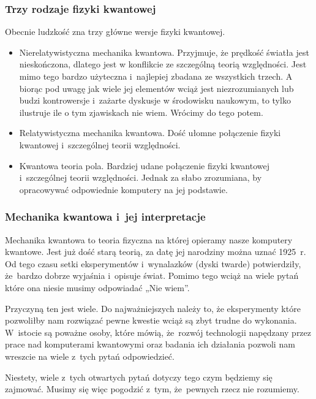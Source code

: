 \documentclass[10pt,t]{beamer}
\begin{document}
\begin{frame}
  \frametitle{Trzy rodzaje fizyki kwantowej}


  Obecnie ludzkość zna trzy główne wersje fizyki kwantowej.

  \begin{itemize}
    \RaggedRight

  \item \alert{Nierelatywistyczna mechanika kwantowa.} Przyjmuje, że
    prędkość światła jest nieskończona, dlatego jest w konflikcie ze
    szczególną teorią względności. Jest mimo tego bardzo użyteczna
    i~najlepiej zbadana ze wszystkich trzech. A biorąc pod uwagę jak
    wiele jej elementów wciąż jest niezrozumianych lub budzi
    kontrowersje i~zażarte dyskusje w środowisku naukowym, to tylko
    ilustruje ile o tym zjawiskach nie wiem. Wrócimy do tego potem.

  \item Relatywistyczna mechanika kwantowa. Dość ułomne połączenie fizyki
    kwantowej i~szczególnej teorii względności.

  \item Kwantowa teoria pola. Bardziej udane połączenie fizyki kwantowej
    i~szczególnej teorii względności. Jednak za słabo zrozumiana, by
    opracowywać odpowiednie komputery na jej podstawie.

  \end{itemize}

\end{frame}





\begin{frame}
  \frametitle{Mechanika kwantowa i~jej interpretacje}


  Mechanika kwantowa to teoria fizyczna na której opieramy nasze komputery
  kwantowe. Jest już dość starą teorią, za datę jej narodziny można uznać
  1925~r. Od tego czasu setki eksperymentów i~wynalazków (dyski
  twarde) potwierdziły, że~bardzo dobrze wyjaśnia i~opisuje świat.
  Pomimo tego wciąż na wiele pytań które ona niesie musimy
  odpowiadać „Nie wiem”.

  Przyczyną ten jest wiele. Do najważniejszych należy to, że
  eksperymenty które pozwoliłby nam rozwiązać pewne kwestie wciąż są
  zbyt trudne do wykonania. W~istocie są poważne osoby, które mówią,
  że~rozwój technologii napędzany przez prace nad komputerami
  kwantowymi oraz badania ich działania pozwoli nam wreszcie
  na wiele z~tych pytań odpowiedzieć.

  Niestety, wiele z~tych otwartych pytań dotyczy tego czym będziemy się
  zajmować. Musimy się więc pogodzić z~tym, że~pewnych rzecz nie rozumiemy.

\end{frame}
\end{document}

